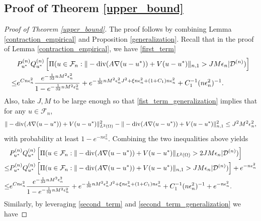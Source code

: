 \documentclass{article}
\newcommand{\F}{\mathcal{F}}
\newcommand{\D}{\mathcal{D}}
\renewcommand{\div}{\textnormal{div}}
\theoremstyle{plain}
\theoremstyle{definition}
\theoremstyle{remark}
\begin{document}
\subsection{Proof of Theorem \ref{upper_bound}} 
\label{proof_upper_bound}
\begin{proof}[Proof of Theorem \ref{upper_bound}]
    The proof follows by combining Lemma \ref{contraction_empirical} and Proposition \ref{generalization}. Recall that in the proof of Lemma \ref{contraction_empirical}, we have \eqref{first_term} 
    \begin{equation*}
    \begin{aligned}
        & P_{u^*}^{(n)} Q_{u^*}^{(n)} \left[\Pi(u \in \F_n: \|-\div(A \nabla (u-u^*)) + V (u-u^*)\|_{n, 1} >  J M \epsilon_n | \D^{(n)} ) \right] \\ \leq &  e^{C n \epsilon_n^2} \frac{e^{-\frac{1}{32}n M^2 \epsilon_n^2}}{1 - e^{-\frac{1}{32}n M^2 \epsilon_n^2}} + e^{-\frac{1}{36} n M^2 \epsilon_{n}^2 J^2 + \xi n\epsilon_n^2 + (1+C_1) n \epsilon_n^2} + C_1^{-1} (n\epsilon_n^2)^{-1}.
    \end{aligned}
\end{equation*}
Also, take $J, M$ to be large enough so that \eqref{fist_term_generalization} implies that for any $u \in \F_n$,
\begin{equation*}
      \|-\div(A \nabla (u-u^*)) + V(u-u^*) \|_{L^2(\Omega)}^2 - \|-\div(A \nabla (u-u^*)) + V(u-u^*) \|_{n, 1}^2  \leq J^2 M^2 \epsilon_n^2,
\end{equation*}
with probability at least $1 - e^{-n\epsilon_n^2}$. 
Combining the two inequalities above yields
\begin{equation} \label{first_term_pupulation}
    \begin{aligned}
        & P_{u^*}^{(n)} Q_{u^*}^{(n)} \left[\Pi(u \in \F_n:  \|-\div(A \nabla (u-u^*)) + V(u-u^*) \|_{L^2(\Omega)} > 2 J M \epsilon_n| \D^{(n)})\right] \\
        \leq & P_{u^*}^{(n)} Q_{u^*}^{(n)} \left[\Pi(u \in \F_n: \|-\div(A \nabla (u-u^*)) + V(u-u^*) \|_{n, 1} >  J M \epsilon_n | \D^{(n)} ) \right] + e^{-n\epsilon_n^2} \\
        \leq & e^{C n \epsilon_n^2} \frac{e^{-\frac{1}{32}n M^2 \epsilon_n^2}}{1 - e^{-\frac{1}{32}n M^2 \epsilon_n^2}} + e^{-\frac{1}{36} n M^2 \epsilon_{n}^2 J^2 + \xi n\epsilon_n^2 + (1+C_1) n \epsilon_n^2} + C_1^{-1} (n\epsilon_n^2)^{-1} + e^{-n\epsilon_n^2}. 
    \end{aligned}
\end{equation}
Similarly, by leveraging \eqref{second_term} and \eqref{second_term_generalization} we have 

\end{proof}
\end{document}
